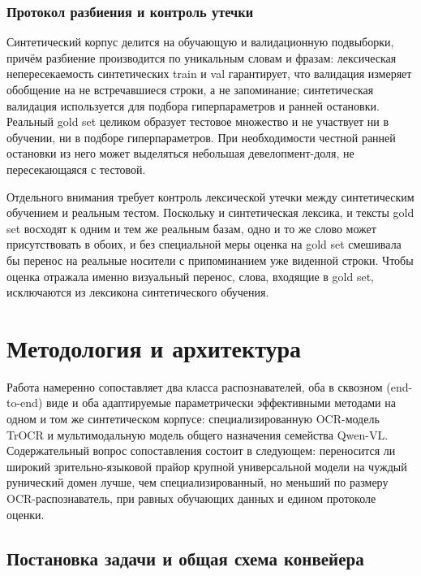 \documentclass[a4paper,12pt]{extarticle}
\begin{document}
\subsubsection{Протокол разбиения и контроль утечки}
\label{sec:preprocessing-split}
 
Синтетический корпус делится на обучающую и валидационную подвыборки, причём разбиение производится по уникальным словам и фразам: лексическая непересекаемость синтетических train и val гарантирует, что валидация измеряет обобщение на не встречавшиеся строки, а не запоминание; синтетическая валидация используется для подбора гиперпараметров и ранней остановки. Реальный gold set целиком образует тестовое множество и не участвует ни в обучении, ни в подборе гиперпараметров. При необходимости честной ранней остановки из него может выделяться небольшая девелопмент-доля, не пересекающаяся с тестовой.
 
Отдельного внимания требует контроль лексической утечки между синтетическим обучением и реальным тестом. Поскольку и синтетическая лексика, и тексты gold set восходят к одним и тем же реальным базам, одно и то же слово может присутствовать в обоих, и без специальной меры оценка на gold set смешивала бы перенос на реальные носители с припоминанием уже виденной строки. Чтобы оценка отражала именно визуальный перенос, слова, входящие в gold set, исключаются из лексикона синтетического обучения.
 

\section{Методология и архитектура}
\label{sec:method}
 
Работа намеренно сопоставляет два класса распознавателей, оба в сквозном (end-to-end) виде и оба адаптируемые параметрически эффективными методами на одном и том же синтетическом корпусе: специализированную OCR-модель TrOCR и мультимодальную модель общего назначения семейства Qwen-VL. Содержательный вопрос сопоставления состоит в следующем: переносится ли широкий зрительно-языковой прайор крупной универсальной модели на чуждый рунический домен лучше, чем специализированный, но меньший по размеру OCR-распознаватель, при равных обучающих данных и едином протоколе оценки.
 
\subsection{Постановка задачи и общая схема конвейера}
\label{sec:method-setup}
 
\end{document}
